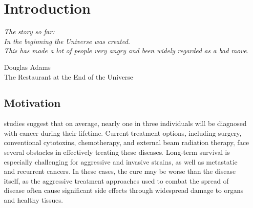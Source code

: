 \chapter{Introduction}


\epigraph{\textit{The story so far:\\In the beginning the Universe was created.\\This has made a lot of people very angry and been widely regarded as a bad move.}}{Douglas Adams \\ The Restaurant at the End of the Universe}


\section{Motivation}







 studies suggest that on average, nearly one in three individuals will be diagnosed with cancer during their lifetime. 
Current treatment options, including surgery, conventional cytotoxins, chemotherapy, and external beam radiation therapy, face several obstacles in effectively treating these diseases. 
Long-term survival is especially challenging for aggressive and invasive strains, as well as metastatic and recurrent cancers. 
In these cases, the cure may be worse than the disease itself, as the aggressive treatment approaches used to combat the spread of disease often cause significant side effects through widespread damage to organs and healthy tissues. 


